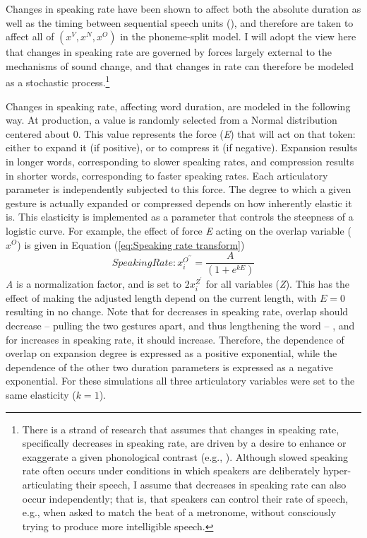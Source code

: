 Changes in speaking rate have been shown to affect both the absolute
duration as well as the timing between sequential speech units (\citealt{stetson1928motor,Hardcastle1985}),
and therefore are taken to affect all of $(x^{V},x^{N},x^{O})$ in
the phoneme-split model. I will adopt the view here that changes in
speaking rate are governed by forces largely external to the mechanisms
of sound change, and that changes in rate can therefore be modeled
as a stochastic process.\footnote{There is a strand of research that assumes that changes in speaking
rate, specifically decreases in speaking rate, are driven by a desire
to enhance or exaggerate a given phonological contrast (e.g., \citealt{beckman2011rate}).
Although slowed speaking rate often occurs under conditions in which
speakers are deliberately hyper-articulating their speech, I assume
that decreases in speaking rate can also occur independently; that
is, that speakers can control their rate of speech, e.g., when asked
to match the beat of a metronome, without consciously trying to produce
more intelligible speech.}

Changes in speaking rate, affecting word duration, are modeled in
the following way. At production, a value is randomly selected from
a Normal distribution centered about 0. This value represents the
force (\emph{E}) that will act on that token: either to expand it
(if positive), or to compress it (if negative). Expansion results
in longer words, corresponding to slower speaking rates, and compression
results in shorter words, corresponding to faster speaking rates.
Each articulatory parameter is independently subjected to this force.
The degree to which a given gesture is actually expanded or compressed
depends on how inherently elastic it is. This elasticity is implemented
as a parameter that controls the steepness of a logistic curve. For
example, the effect of force \emph{E} acting on the overlap variable
($x^{O}$) is given in Equation (\ref{eq:Speaking rate transform}) 
\begin{equation}
\textit{SpeakingRate}:x_{i}^{O^{\prime\prime}}=\frac{A}{(1+e^{kE})}\label{eq:Speaking rate transform}
\end{equation}
\emph{A} is a normalization factor, and is set to $2x_{i}^{Z^{\prime}}$
for all variables (\emph{Z}). This has the effect of making the adjusted
length depend on the current length, with $E=0$ resulting in no change.
Note that for decreases in speaking rate, overlap should decrease
– pulling the two gestures apart, and thus lengthening the word –
, and for increases in speaking rate, it should increase. Therefore,
the dependence of overlap on expansion degree is expressed as a positive
exponential, while the dependence of the other two duration parameters
is expressed as a negative exponential. For these simulations all
three articulatory variables were set to the same elasticity ($k=1$). 


